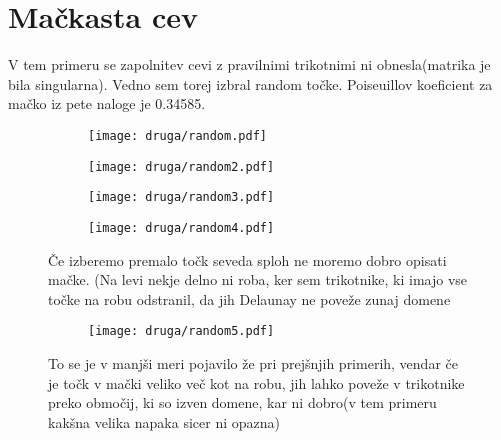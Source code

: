 \documentclass{article}
\begin{document}
\section{Mačkasta cev}

V tem primeru se zapolnitev cevi z pravilnimi trikotnimi ni obnesla(matrika je bila singularna). Vedno sem torej izbral random točke. Poiseuillov koeficient za mačko iz pete naloge je 0.34585.

\begin{figure}[H]
\centering
\begin{subfigure}{\textwidth}
\texttt{[image: druga/random.pdf]}
\end{subfigure}
\end{figure}

\begin{figure}[H]
\centering
\begin{subfigure}{\textwidth}
\texttt{[image: druga/random2.pdf]}
\end{subfigure}
\end{figure}

\begin{figure}[H]
\centering
\begin{subfigure}{\textwidth}
\texttt{[image: druga/random3.pdf]}
\end{subfigure}
\end{figure}

\begin{figure}[H]
\centering
\begin{subfigure}{\textwidth}
\texttt{[image: druga/random4.pdf]}
\end{subfigure}
\caption*{Če izberemo premalo točk seveda sploh ne moremo dobro opisati mačke. (Na levi nekje delno ni roba, ker sem trikotnike, ki imajo vse točke na robu odstranil, da jih Delaunay ne poveže zunaj domene}
\end{figure}

\begin{figure}[H]
\centering
\begin{subfigure}{\textwidth}
\texttt{[image: druga/random5.pdf]}
\end{subfigure}
\caption*{To se je v manjši meri pojavilo že pri prejšnjih primerih, vendar če je točk v mački veliko več kot na robu, jih lahko poveže v trikotnike preko območij, ki so izven domene, kar ni dobro(v tem primeru kakšna velika napaka sicer ni opazna)}
\end{figure}
\end{document}
